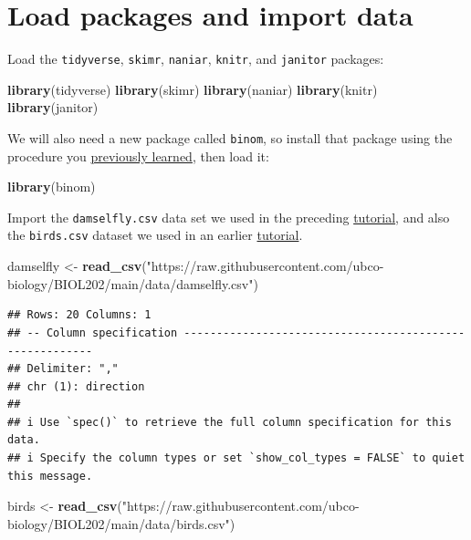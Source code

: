 \documentclass[
]{book}
\newenvironment{Shaded}{\begin{snugshade}}{\end{snugshade}}
\newcommand{\FunctionTok}[1]{\textcolor[rgb]{0.13,0.29,0.53}{\textbf{#1}}}
\newcommand{\NormalTok}[1]{#1}
\newcommand{\OtherTok}[1]{\textcolor[rgb]{0.56,0.35,0.01}{#1}}
\newcommand{\StringTok}[1]{\textcolor[rgb]{0.31,0.60,0.02}{#1}}
\begin{document}
\section{Load packages and import data}\label{singcat_packages_data}

Load the \texttt{tidyverse}, \texttt{skimr}, \texttt{naniar}, \texttt{knitr}, and \texttt{janitor} packages:

\begin{Shaded}
\begin{Highlighting}[]
\FunctionTok{library}\NormalTok{(tidyverse)}
\FunctionTok{library}\NormalTok{(skimr)}
\FunctionTok{library}\NormalTok{(naniar)}
\FunctionTok{library}\NormalTok{(knitr)}
\FunctionTok{library}\NormalTok{(janitor)}
\end{Highlighting}
\end{Shaded}

We will also need a new package called \texttt{binom}, so install that package using the procedure you \hyperref[package_install]{previously learned}, then load it:

\begin{Shaded}
\begin{Highlighting}[]
\FunctionTok{library}\NormalTok{(binom)}
\end{Highlighting}
\end{Shaded}

Import the \texttt{damselfly.csv} data set we used in the preceding \hyperref[hypothesis]{tutorial}, and also the \texttt{birds.csv} dataset we used in an earlier \hyperref[vis_describe]{tutorial}.

\begin{Shaded}
\begin{Highlighting}[]
\NormalTok{damselfly }\OtherTok{\textless{}{-}} \FunctionTok{read\_csv}\NormalTok{(}\StringTok{"https://raw.githubusercontent.com/ubco{-}biology/BIOL202/main/data/damselfly.csv"}\NormalTok{)}
\end{Highlighting}
\end{Shaded}

\begin{verbatim}
## Rows: 20 Columns: 1
## -- Column specification --------------------------------------------------------
## Delimiter: ","
## chr (1): direction
## 
## i Use `spec()` to retrieve the full column specification for this data.
## i Specify the column types or set `show_col_types = FALSE` to quiet this message.
\end{verbatim}

\begin{Shaded}
\begin{Highlighting}[]
\NormalTok{birds }\OtherTok{\textless{}{-}} \FunctionTok{read\_csv}\NormalTok{(}\StringTok{"https://raw.githubusercontent.com/ubco{-}biology/BIOL202/main/data/birds.csv"}\NormalTok{)}
\end{Highlighting}
\end{Shaded}
\end{document}
